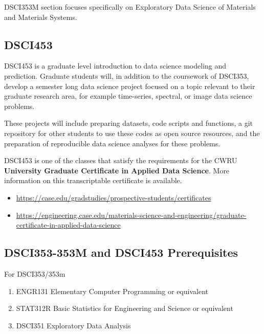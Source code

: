 \documentclass[10pt]{article} %
\begin{document}
    DSCI353M section focuses specifically on Exploratory Data Science of Materials and Materials Systems.

  \subsection{DSCI453}

    DSCI453 is a graduate level introduction to data science modeling and prediction.
    Graduate students will, in addition to the coursework of DSCI353, develop a semester long data science project focused on a topic relevant to their graduate research area, for example time-series, spectral, or image data science problems.

    These projects will include preparing datasets, code scripts and functions, a git repository for other students to use these codes as open source resources, and the preparation of reproducible data science analyses for these problems.

    DSCI453 is one of the classes that satisfy the requirements for the CWRU \textbf{University Graduate Certificate in Applied Data Science}.
    More information on this transcriptable certificate is available.

    \begin{itemize}
      \item \href{https://case.edu/gradstudies/prospective-students/certificates}{https://case.edu/gradstudies/prospective-students/certificates}
      \item \href{https://engineering.case.edu/materials-science-and-engineering/graduate-certificate-in-applied-data-science}{https://engineering.case.edu/materials-science-and-engineering/graduate-certificate-in-applied-data-science}
    \end{itemize}

  \subsection{DSCI353-353M and DSCI453 Prerequisites}

    For DSCI353/353m
    \begin{enumerate}
      \item ENGR131 Elementary Computer Programming or equivalent
      \item STAT312R Basic Statistics for Engineering and Science or equivalent
      \item DSCI351 Exploratory Data Analysis
    \end{enumerate}
\end{document}
